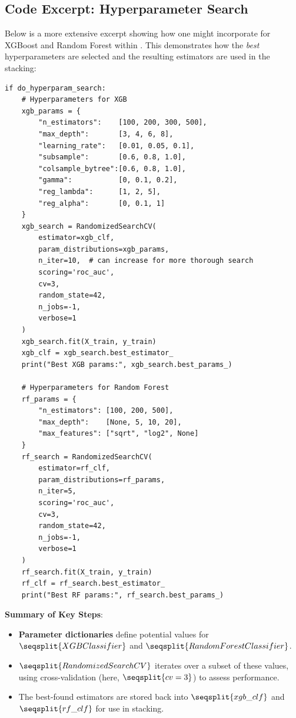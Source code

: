 \documentclass[12pt]{article}
\begin{document}
\subsection{Code Excerpt: Hyperparameter Search}
Below is a more extensive excerpt showing how one might incorporate  for XGBoost and Random Forest within . This demonstrates how the \emph{best} hyperparameters are selected and the resulting estimators are used in the stacking:

\begin{verbatim}
if do_hyperparam_search:
    # Hyperparameters for XGB
    xgb_params = {
        "n_estimators":    [100, 200, 300, 500],
        "max_depth":       [3, 4, 6, 8],
        "learning_rate":   [0.01, 0.05, 0.1],
        "subsample":       [0.6, 0.8, 1.0],
        "colsample_bytree":[0.6, 0.8, 1.0],
        "gamma":           [0, 0.1, 0.2],
        "reg_lambda":      [1, 2, 5],
        "reg_alpha":       [0, 0.1, 1]
    }
    xgb_search = RandomizedSearchCV(
        estimator=xgb_clf,
        param_distributions=xgb_params,
        n_iter=10,  # can increase for more thorough search
        scoring='roc_auc',
        cv=3,
        random_state=42,
        n_jobs=-1,
        verbose=1
    )
    xgb_search.fit(X_train, y_train)
    xgb_clf = xgb_search.best_estimator_
    print("Best XGB params:", xgb_search.best_params_)

    # Hyperparameters for Random Forest
    rf_params = {
        "n_estimators": [100, 200, 500],
        "max_depth":    [None, 5, 10, 20],
        "max_features": ["sqrt", "log2", None]
    }
    rf_search = RandomizedSearchCV(
        estimator=rf_clf,
        param_distributions=rf_params,
        n_iter=5,
        scoring='roc_auc',
        cv=3,
        random_state=42,
        n_jobs=-1,
        verbose=1
    )
    rf_search.fit(X_train, y_train)
    rf_clf = rf_search.best_estimator_
    print("Best RF params:", rf_search.best_params_)
\end{verbatim}

\noindent
\textbf{Summary of Key Steps}:
\begin{itemize}
    \item \textbf{Parameter dictionaries} define potential values for \(\seqsplit{XGBClassifier}\) and \(\seqsplit{RandomForestClassifier}\).
    \item \(\seqsplit{RandomizedSearchCV}\) iterates over a subset of these values, using cross-validation (here, \(\seqsplit{cv=3}\)) to assess performance.
    \item The best-found estimators are stored back into \(\seqsplit{xgb\_clf}\) and \(\seqsplit{rf\_clf}\) for use in stacking.
\end{itemize}
\end{document}

